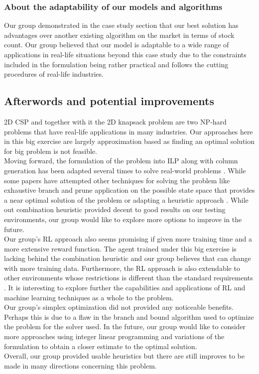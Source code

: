 \documentclass[a4paper]{article}
\begin{document}
    \subsubsection{About the adaptability of our models and algorithms}
    Our group demonstrated in the case study section that our best solution has advantages over another existing algorithm on the market in terms of stock count. Our group believed that our model is adaptable to a wide range of applications in real-life situations beyond this case study due to the constraints included in the formulation being rather practical and follows the cutting procedures of real-life industries.
    \subsection{Afterwords and potential improvements}
    2D CSP and together with it the 2D knapsack problem are two NP-hard problems that have real-life applications in many industries. Our approaches here in this big exercise are largely approximation based as finding an optimal solution for big problem is not feasible. 
    \vspace{0.2cm} \\
    Moving forward, the formulation of the problem into ILP along with column generation has been adapted several times to solve real-world problems \cite{columnGenCintra} \cite{columnGenRosaFurini}. While some papers have attempted other techniques for solving the problem like exhaustive branch and prune application on the possible state space that provides a near optimal solution of the problem\cite{IORI2021399} or adapting a heuristic approach \cite{https://doi.org/10.1155/2021/3732720}. While out combination heuristic provided decent to good results on our testing environments, our group would like to explore more options to improve in the future. 
    \vspace{0.2cm} \\
    Our group's RL approach also seems promising if given more training time and a more extensive reward function. The agent trained under this big exercise is lacking behind the combination heuristic and our group believes that can change with more training data. Furthermore, the RL approach is also extendable to other environments whose restrictions is different than the standard requirements \cite{limitedopenstack}. It is interesting to explore further the capabilities and applications of RL and machine learning techniques as a whole to the problem.
    \vspace{0.2cm} \\
    Our group's simplex optimization did not provided any noticeable benefits. Perhaps this is due to a flaw in the branch and bound algorithm used to optimize the problem for the solver used. In the future, our group would like to consider more approaches using integer linear programming and variations of the formulation to obtain a closer estimate to the optimal solution. 
    \vspace{0.2cm} \\
    Overall, our group provided usable heuristics but there are still improves to be made in many directions concerning this problem.
\end{document}
